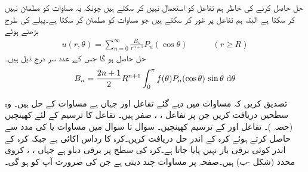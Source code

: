  حل حاصل کرنے کی خاطر ہم تفاعل  کو استعمال نہیں کر سکتے ہیں چونکہ یہ مساوات  کو مطمئن نہیں کر سکتا ہے البتہ ہم تفاعل  پر غور کر سکتے ہیں جو مساوات  کو مطمئن کر سکتا ہے۔پہلے کی طرح بڑھتے ہوئے
\begin{align}
u(r,\theta)=\sum_{n=0}^{\infty} \frac{B_n}{r^{n+1}}P_n(\cos\theta)\quad \quad \quad (r\ge R)
\end{align}
حل حاصل ہو گا جس کے عدد سر درج ذیل ہیں۔
\begin{align}
B_n=\frac{2n+1}{2}R^{n+1}\int_0^{\pi} f(\theta)P_n(\cos \theta)\,\sin\theta\,\dif \theta
\end{align}


\quad
تصدیق کریں کہ مساوات  میں دیے گئے تفاعل  اور  جہاں  ہے مساوات  کے حل ہیں۔ 
\quad
وہ سطحیں دریافت کریں جن پر تفاعل ، ،  صفر ہیں۔
\quad
تفاعل  کا ترسیم  کے لئے کھینچیں (حصہ )۔
\quad
تفاعل  اور  کے ترسیم کھینچیں۔
سوال  تا سوال  میں مساوات  یا  کی مدد سے   حاصل کرتے ہوئے کرہ کے اندر حل  دریافت کریں۔کرہ کا رداس اکائی  ہے جبکہ کرہ کے اندر کوئی برقی بار نہیں پایا جاتا ہے۔کرہ کی سطح پر برقی دباو  ہے جہاں ، ،  کروی محدد (شکل -ب) ہیں۔صفحہ  پر مساوات   چند  دیتی ہے جن کی ضرورت آپ کو ہو گی۔ 

